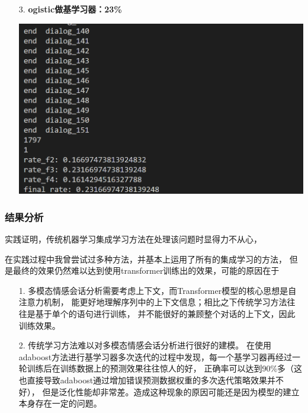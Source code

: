\documentclass[11pt]{article}
\begin{document}
\begin{enumerate}
\begin{center}
                \end{center}
                \item [3. ]\textbf{ogistic做基学习器：23\%}
                \begin{center}
                    \includegraphics[scale=1]{graph/result3.png}
                \end{center}
            \end{enumerate}

            \subsubsection{结果分析}
            实践证明，传统机器学习集成学习方法在处理该问题时显得力不从心，
            
            在实践过程中我曾尝试过多种方法，并基本上运用了所有的集成学习的方法，
            但是最终的效果仍然难以达到使用transformer训练出的效果，可能的原因在于
            
            \begin{enumerate}
                \item [1. ]多模态情感会话分析需要考虑上下文，而Transformer模型的核心思想是自注意力机制，
                            能更好地理解序列中的上下文信息；相比之下传统学习方法往往是基于单个的语句进行训练，
                            并不能很好的兼顾整个对话的上下文，因此训练效果。

                \item [2. ]传统学习方法难以对多模态情感会话分析进行很好的建模。
                            在使用adaboost方法进行基学习器多次迭代的过程中发现，每一个基学习器再经过一轮训练后在训练数据上的预测效果往往惊人的好，
                            正确率可以达到90\%多（这也直接导致adaboost通过增加错误预测数据权重的多次迭代策略效果并不好），
                            但是泛化性能却非常差。造成这种现象的原因可能还是因为模型的建立本身存在一定的问题。
            \end{enumerate}
\end{document}
